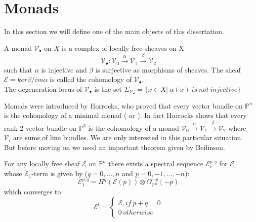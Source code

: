 \documentclass[
	oldfontcommands,
	sumario=abnt-6027-2012,
	12pt,			%
	openright,		%
	oneside,		%
	a4paper,		%
	english,		%
	brazil			%
	]{imecc-unicamp}
\begin{document}
\section{Monads}
In this section we will define one of the main objects of this dissertation.
\begin{definition}\label{def monad}
	A monad $\mathcal{V}_\bullet$ on $X$ is a complex of locally free sheaves on X
	\begin{equation}
	\mathcal{V}_\bullet : \mathcal{V}_0 \overset{ \alpha }{ \to} \mathcal{V}_1 \overset{ \beta }{ \to} \mathcal{V}_2
	\end{equation}
	such that $\alpha$ is injective and $\beta$ is surjective as morphisms of sheaves. The sheaf $\mathcal{E}=ker \beta / im \alpha$ is called the cohomology of $\mathcal{V}_\bullet$.  \\
	The degeneration locus of $\mathcal{V}_\bullet$ is the set $\Sigma_{\mathcal{V}_\bullet} =\{x \in X | \ \alpha(x) \ is \ not \ injective  \} $
\end{definition}
Monads were introduced by Horrocks, who proved that every vector bundle on $\mathbb{P}^n$ is the cohomology of a minimal monad (\cite[Horrocks]{doi:10.1112/plms/s3-14.4.689} or \cite[Barth]{Barth1978}). In fact Horrocks shows that every rank 2 vector bundle on $\mathbb{P}^3$ is the cohomology of a monad $\mathcal{V}_0 \overset{ \alpha }{ \to} \mathcal{V}_1 \overset{ \beta }{ \to} \mathcal{V}_2$ where $\mathcal{V}_i$ are sums of line bundles. We are only interested in this particular situation. But before moving on we need an important theorem given by Beilinson.
\begin{theorem}\cite[Okonek, Schneider \& Spindler, p. 240]{Okonek}\label{beilinson1}
For any locally free sheaf $\mathcal{E}$ on $\mathbb{P}^n$ there exists a spectral sequence {$\mathcal{E}^{p,q}_r$} for $\mathcal{E}$ whose $\mathcal{E}_1$-term is given by ($q=0,...,n$ and $p=0,-1,...,-n$):
\begin{equation}
\mathcal{E}^{p,q}_1=H^q(\mathcal{E}(p)) \otimes \Omega^{-p}_{\mathbb{P}^n}(-p)
\end{equation}
which converges to 
\begin{equation}
\mathcal{E}^{i} = \begin{cases} \mathcal{E}, if \ p+q=0 \\ 0 \ otherwise
\end{cases}
\end{equation}
\end{theorem}
\end{document}
